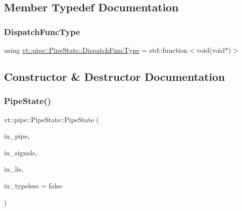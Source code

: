 \subsection{Member Typedef Documentation}
\mbox{\label{structvt_1_1pipe_1_1_pipe_state_ad81b637847d9c3185420c58c9272ed7d}} 
\subsubsection{\texorpdfstring{Dispatch\+Func\+Type}{DispatchFuncType}}
{\footnotesize\ttfamily using \hyperlink{structvt_1_1pipe_1_1_pipe_state_ad81b637847d9c3185420c58c9272ed7d}{vt\+::pipe\+::\+Pipe\+State\+::\+Dispatch\+Func\+Type} =  std\+::function$<$void(void$\ast$)$>$}



\subsection{Constructor \& Destructor Documentation}
\mbox{\label{structvt_1_1pipe_1_1_pipe_state_abbddca53ca44e4417c347235968c7ad9}} 
\subsubsection{\texorpdfstring{Pipe\+State()}{PipeState()}\hspace{0.1cm}{\footnotesize\ttfamily [1/2]}}
{\footnotesize\ttfamily vt\+::pipe\+::\+Pipe\+State\+::\+Pipe\+State (\begin{DoxyParamCaption}\item[{\hyperlink{namespacevt_ac9852acda74d1896f48f406cd72c7bd3}{Pipe\+Type} const \&}]{in\+\_\+pipe,  }\item[{\hyperlink{namespacevt_a9b39ce9494bb04674d0d5b895a5aa50f}{Ref\+Type} const \&}]{in\+\_\+signals,  }\item[{\hyperlink{namespacevt_a9b39ce9494bb04674d0d5b895a5aa50f}{Ref\+Type} const \&}]{in\+\_\+lis,  }\item[{bool const \&}]{in\+\_\+typeless = {\ttfamily false} }\end{DoxyParamCaption})}

